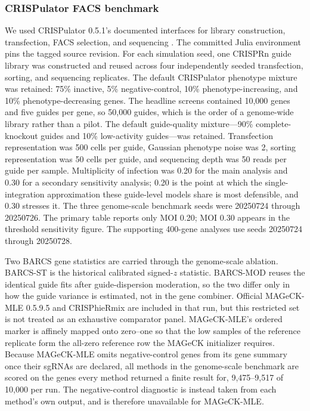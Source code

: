 \subsubsection{CRISPulator FACS benchmark}

We used CRISPulator 0.5.1's documented interfaces for library construction,
transfection, FACS selection, and sequencing \citep{nagy2017crispulator}.
The committed Julia environment pins the tagged source revision.  For each
simulation seed, one CRISPRn guide library was constructed and reused across
four independently seeded transfection, sorting, and sequencing replicates.
The default CRISPulator phenotype mixture was retained: 75\% inactive, 5\%
negative-control, 10\% phenotype-increasing, and 10\%
phenotype-decreasing genes.  The headline screens contained 10,000 genes and
five guides per gene, so 50,000 guides, which is the order of a genome-wide
library rather than a pilot.  The default guide-quality mixture---90\%
complete-knockout guides and 10\% low-activity guides---was retained.
Transfection representation was 500 cells per guide, Gaussian phenotype noise
was 2, sorting representation was 50 cells per guide, and sequencing depth was
50 reads per guide per sample.  Multiplicity of infection was 0.20 for the
main analysis and 0.30 for a secondary sensitivity analysis; 0.20 is the point at
which the single-integration approximation these guide-level models share is
most defensible, and 0.30 stresses it.  The three genome-scale benchmark seeds
were 20250724 through 20250726.  The primary table reports only MOI 0.20;
MOI 0.30 appears in the threshold sensitivity figure.  The supporting
400-gene analyses use seeds 20250724 through 20250728.

Two BARCS gene statistics are carried through the genome-scale ablation.
BARCS-ST is the historical calibrated signed-$z$ statistic.  BARCS-MOD reuses
the identical guide fits after guide-dispersion moderation, so the two differ
only in how the guide variance is estimated, not in the gene combiner.
Official MAGeCK-MLE 0.5.9.5 and CRISPhieRmix are included in that run,
but this restricted set is not treated as an exhaustive comparator panel.
MAGeCK-MLE's ordered marker is affinely mapped onto zero--one so that the low
samples of the reference
replicate form the all-zero reference row the MAGeCK initializer requires.
Because MAGeCK-MLE omits negative-control genes from its gene summary once
their sgRNAs are declared, all methods in the genome-scale benchmark are
scored on the genes every method returned a finite result for, 9,475--9,517
of 10,000 per run.  The negative-control diagnostic is instead taken from
each method's own output, and is therefore unavailable for MAGeCK-MLE.

